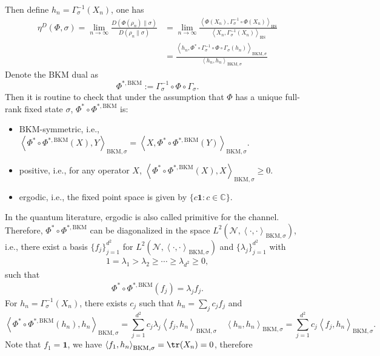 \documentclass[11pt,reqno]{amsart}
\numberwithin{equation}{section}
\newcommand{\mb}{\mathbb}
\newcommand{\mc}{\mathcal}
\newcommand{\HS}[2]{\left\langle #1,#2\right\rangle_{\mathrm{HS}}} %
\newcommand{\BKM}[2]{\left\langle #1,#2\right\rangle_{\mathrm{BKM},\sigma}} %
\begin{document}
Then define $h_n = \Gamma_\sigma^{-1}(X_n)$, one has 
\begin{align*}
    \eta^D(\Phi,\sigma) = \lim_{n\to \infty} \frac{D(\Phi(\rho_n) \| \sigma)}{D(\rho_n \| \sigma)} & = \lim_{n\to \infty} \frac{\HS{\Phi(X_n)}{\Gamma_\sigma^{-1}\circ \Phi(X_n)}}{\HS{X_n}{\Gamma_\sigma^{-1}(X_n)}} \\
    & = \frac{\BKM{h_n}{\Phi^*\circ \Gamma_\sigma^{-1} \circ \Phi \circ \Gamma_\sigma(h_n)}}{\BKM{h_n}{h_n}}
\end{align*}
Denote the BKM dual as 
\begin{equation}\label{def:BKM dual}
    \Phi^{*,\mathrm{BKM}}:= \Gamma_\sigma^{-1} \circ \Phi \circ \Gamma_\sigma.
\end{equation}
Then it is routine to check that under the assumption that $\Phi$ has a unique full-rank fixed state $\sigma$, $\Phi^* \circ \Phi^{*,\mathrm{BKM}}$ is:
\begin{itemize}
    \item $\mathrm{BKM}$-symmetric, i.e., $\BKM{\Phi^* \circ \Phi^{*,\mathrm{BKM}}(X)}{Y} = \BKM{X}{\Phi^* \circ \Phi^{*,\mathrm{BKM}}(Y)}$.
    \item positive, i.e., for any operator $X$, $\BKM{\Phi^* \circ \Phi^{*,\mathrm{BKM}}(X)}{X} \ge 0$. 
    \item ergodic, i.e., the fixed point space is given by $\{c \textbf{1}: c \in \mb C\}$.
\end{itemize}
In the quantum literature, ergodic is also called primitive for the channel. Therefore, $\Phi^* \circ \Phi^{*, \mathrm{BKM}}$ can be diagonalized in the space $L^2(\mc N, \BKM{\cdot}{\cdot})$, i.e., there exist a basis $\{f_j\}_{j=1}^{d^2}$ for $L^2(\mc N, \BKM{\cdot}{\cdot})$ and $\{\lambda_j\}_{j=1}^{d^2}$ with \begin{align*}
    1 = \lambda_1 > \lambda_2 \ge \cdots \ge \lambda_{d^2} \ge 0,
\end{align*}
such that 
\begin{align*}
    \Phi^* \circ \Phi^{*, \mathrm{BKM}}(f_j) = \lambda_j f_j.
\end{align*}
For $h_n = \Gamma_\sigma^{-1}(X_n)$, there exists $c_j$ such that $ h_n = \sum_j c_j f_j$ and 
\begin{equation}
   \BKM{\Phi^* \circ \Phi^{*, \mathrm{BKM}}(h_n) }{h_n} = \sum_{j=1}^{d^2} c_j \lambda_j \BKM{f_j}{h_n}  \quad \BKM{h_n}{h_n} = \sum_{j=1}^{d^2} c_j \BKM{f_j}{h_n} .
\end{equation}
Note that $f_1 = \textbf{1}$, we have $\BKM{f_1}{h_n} = \tr(X_n) = 0$, therefore
\end{document}
